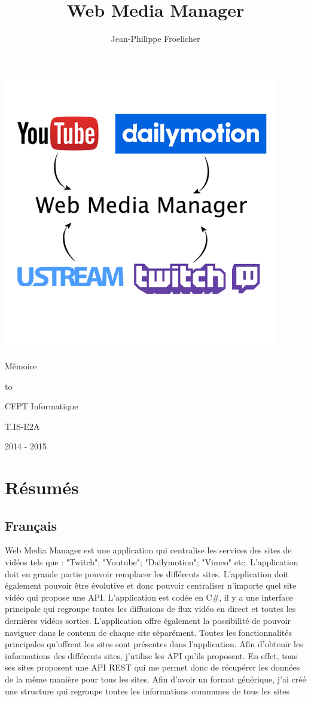 \documentclass[11pt]{report} %
\title{Web Media Manager}
\author{Jean-Philippe Froelicher}
\date{} %
\makeatletter
\def\maketitle{%
	\null
	\thispagestyle{empty}%
	\vskip 1cm
	\begin{center}
		\Huge \strut \@title \par
		\large \strut Mêmoire
	\end{center}
	\ifhmode\par\fi
	\hbox to \hsize{\hfill
		\vrule height 2pt width.5\hsize
		\hfill}%
	\begin{center}
		\normalfont\large CFPT Informatique\par
		\normalfont\large\@author\par
		\normalfont T.IS-E2A
	\end{center}
	\begin{center}
		\normalfont\large 2014 - 2015
	\end{center}
	\par
	\vfil
	\vfil
	\null
	\cleardoublepage
}
\makeatother
\begin{document}
\includegraphics[width=0.9\textwidth]{../img/logoWebMediaManager.png}
\maketitle

\newpage

\tableofcontents

\chapter{Résumés}
	\section{Français}
		Web Media Manager est une application qui centralise les services des sites de vidéos tels que :
		"Twitch"; "Youtube"; "Dailymotion"; "Vimeo" etc. L'application doit en grande partie pouvoir
		remplacer les différents sites. L'application doit également pouvoir être évolutive et donc pouvoir
		centraliser n'importe quel site vidéo qui propose une API.
		L'application est codée en C\#, il y a une interface principale qui regroupe toutes les diffusions de
		flux vidéo en direct et toutes les dernières vidéos sorties. L'application offre également la possibilité
		de pouvoir naviguer dans le contenu de chaque site séparément. Toutes les fonctionnalités
		principales qu'offrent les sites sont présentes dans l'application.
		Afin d'obtenir les informations des différents sites, j'utilise les API qu'ils proposent. En effet, tous
		ses sites proposent une API REST qui me permet donc de récupérer les données de la même
		manière pour tous les sites. Afin d'avoir un format générique, j'ai créé une structure qui regroupe
		toutes les informations communes de tous les sites
	
\end{document}
